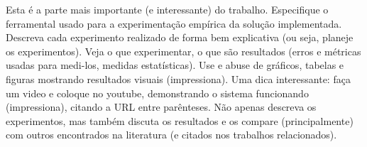 
\label{Cap:ExperimentosResultados}

Esta é a parte mais importante (e interessante) do trabalho. Especifique o ferramental usado para a experimentação empírica da solução implementada. Descreva cada experimento realizado de forma bem explicativa (ou seja, planeje os experimentos). Veja o que experimentar, o que são resultados (erros e métricas usadas para medi-los, medidas estatísticas). Use e abuse de gráficos, tabelas e figuras mostrando resultados visuais (impressiona). Uma dica interessante: faça um video e coloque no youtube, demonstrando o sistema funcionando (impressiona), citando a URL entre parênteses. Não apenas descreva os experimentos, mas também discuta os resultados e os compare (principalmente) com outros encontrados na literatura (e citados nos trabalhos relacionados).

